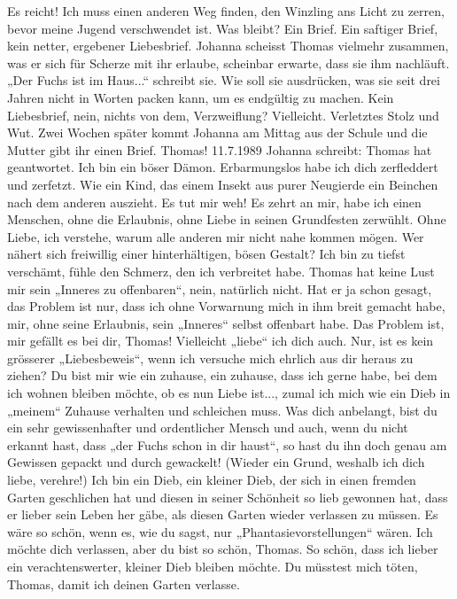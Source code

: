 Es reicht! Ich muss einen anderen Weg finden, den Winzling ans Licht zu zerren, bevor meine Jugend verschwendet ist. Was bleibt? Ein Brief. Ein saftiger Brief, kein netter, ergebener Liebesbrief. Johanna scheisst Thomas vielmehr zusammen, was er sich für Scherze mit ihr erlaube, scheinbar erwarte, dass sie ihm nachläuft. „Der Fuchs ist im Haus...“ schreibt sie. Wie soll sie ausdrücken, was sie seit drei Jahren nicht in Worten packen kann, um es endgültig zu machen. Kein Liebesbrief, nein, nichts von dem, Verzweiflung? Vielleicht. Verletztes Stolz und Wut.
Zwei Wochen später kommt Johanna am Mittag aus der Schule und die Mutter gibt ihr einen Brief. Thomas!
11.7.1989
Johanna schreibt:
Thomas hat geantwortet. Ich bin ein böser Dämon. Erbarmungslos habe ich dich zerfleddert und zerfetzt. Wie ein Kind, das einem Insekt aus purer Neugierde ein Beinchen nach dem anderen auszieht. Es tut mir weh!
Es zehrt an mir, habe ich einen Menschen, ohne die Erlaubnis, ohne Liebe in seinen Grundfesten zerwühlt.
Ohne Liebe, ich verstehe, warum alle anderen mir nicht nahe kommen mögen. Wer nähert sich freiwillig einer hinterhältigen, bösen Gestalt? Ich bin zu tiefst verschämt, fühle den Schmerz, den ich verbreitet habe. 
Thomas hat keine Lust mir sein „Inneres zu offenbaren“, nein, natürlich nicht. Hat er ja schon gesagt, das Problem ist nur, dass ich ohne Vorwarnung mich in ihm breit gemacht habe, mir, ohne seine Erlaubnis, sein „Inneres“ selbst offenbart habe.
Das Problem ist, mir gefällt es bei dir, Thomas! Vielleicht „liebe“ ich dich auch. Nur, ist es kein grösserer „Liebesbeweis“, wenn ich versuche mich ehrlich aus dir heraus zu ziehen?
Du bist mir wie ein zuhause, ein zuhause, dass ich gerne habe, bei dem ich wohnen bleiben möchte, ob es nun Liebe ist..., zumal ich mich wie ein Dieb in „meinem“ Zuhause verhalten und schleichen muss.
Was dich anbelangt, bist du ein sehr gewissenhafter und ordentlicher Mensch und auch, wenn du nicht erkannt hast, dass „der Fuchs schon in dir haust“, so hast du ihn doch genau am Gewissen gepackt und durch gewackelt! (Wieder ein Grund, weshalb ich dich liebe, verehre!)
Ich bin ein Dieb, ein kleiner Dieb, der sich in einen fremden Garten geschlichen hat und diesen in seiner Schönheit so lieb gewonnen hat, dass er lieber sein Leben her gäbe, als diesen Garten wieder verlassen zu müssen. Es wäre so schön, wenn es, wie du sagst, nur „Phantasievorstellungen“ wären. Ich möchte dich verlassen, aber du bist so schön, Thomas. So schön, dass ich lieber ein verachtenswerter, kleiner Dieb bleiben möchte. Du müsstest mich töten, Thomas, damit ich deinen Garten verlasse.
